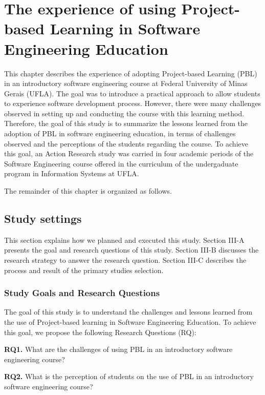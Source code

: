 \chapter{The experience of using Project-based Learning in Software Engineering Education}
\label{ch:actionResearch}

This chapter describes the experience of adopting Project-based Learning (PBL) in an introductory software engineering course at Federal University of Minas Gerais (UFLA). The goal was to introduce a practical approach to allow students to experience software development process. However, there were many challenges observed in setting up and conducting the course with this learning method. Therefore, the goal of this study is to summarize the lessons learned from the adoption of PBL in software engineering education, in terms of challenges observed and the perceptions of the students regarding the course. To achieve this goal, an Action Research study was carried in four academic periods of the Software Engineering course offered in the curriculum of the undergaduate program in Information Systems at UFLA.

The remainder of this chapter is organized as follows.

\section{Study settings}

This section explains how we planned and executed this study. Section III-A presents the goal and research questions of this study. Section III-B discusses the research strategy to answer the research question. Section III-C describes the process and result of the primary studies selection. 

\subsection{Study Goals and Research Questions}

The goal of this study is to understand the challenges and lessons learned from the use of Project-based learning in Software Engineering Education. To achieve this goal, we propose the following Research Questions (RQ):

\textbf{RQ1.} What are the challenges of using PBL in an introductory software engineering course?

\textbf{RQ2.} What is the perception of students on the use of PBL in an introductory software engineering course?

